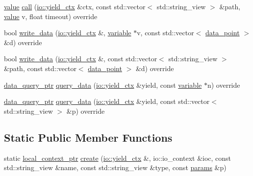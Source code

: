 \begin{DoxyCompactItemize}
\item 
\hyperlink{classtelegraph_1_1value}{value} \hyperlink{classtelegraph_1_1device_a581368ab8f35ef72db17d2e330ded068}{call} (\hyperlink{structboost_1_1asio_1_1yield__ctx}{io\+::yield\+\_\+ctx} \&ctx, const std\+::vector$<$ std\+::string\+\_\+view $>$ \&path, \hyperlink{classtelegraph_1_1value}{value} v, float timeout) override
\item 
bool \hyperlink{classtelegraph_1_1device_a60150e55bc6fb63d27252051caf462db}{write\+\_\+data} (\hyperlink{structboost_1_1asio_1_1yield__ctx}{io\+::yield\+\_\+ctx} \&, \hyperlink{classtelegraph_1_1variable}{variable} $\ast$v, const std\+::vector$<$ \hyperlink{classtelegraph_1_1data__point}{data\+\_\+point} $>$ \&d) override
\item 
bool \hyperlink{classtelegraph_1_1device_aaedca7b20bc36f8439d5afccbcaf1304}{write\+\_\+data} (\hyperlink{structboost_1_1asio_1_1yield__ctx}{io\+::yield\+\_\+ctx} \&, const std\+::vector$<$ std\+::string\+\_\+view $>$ \&path, const std\+::vector$<$ \hyperlink{classtelegraph_1_1data__point}{data\+\_\+point} $>$ \&d) override
\item 
\hyperlink{namespacetelegraph_a6ffe775ac48dca2a4013b53d692199c8}{data\+\_\+query\+\_\+ptr} \hyperlink{classtelegraph_1_1device_a4c46c7e98bf5a573a9966fd2cc199021}{query\+\_\+data} (\hyperlink{structboost_1_1asio_1_1yield__ctx}{io\+::yield\+\_\+ctx} \&yield, const \hyperlink{classtelegraph_1_1variable}{variable} $\ast$n) override
\item 
\hyperlink{namespacetelegraph_a6ffe775ac48dca2a4013b53d692199c8}{data\+\_\+query\+\_\+ptr} \hyperlink{classtelegraph_1_1device_a9a5ef799aadf591a355cc1e50442d762}{query\+\_\+data} (\hyperlink{structboost_1_1asio_1_1yield__ctx}{io\+::yield\+\_\+ctx} \&yield, const std\+::vector$<$ std\+::string\+\_\+view $>$ \&p) override
\end{DoxyCompactItemize}
\subsection*{Static Public Member Functions}
\begin{DoxyCompactItemize}
\item 
static \hyperlink{namespacetelegraph_ab59c7b38d99a98b4acc22433c920b1e6}{local\+\_\+context\+\_\+ptr} \hyperlink{classtelegraph_1_1device_a4bb333fc0232bdb69283e71f086028c4}{create} (\hyperlink{structboost_1_1asio_1_1yield__ctx}{io\+::yield\+\_\+ctx} \&, io\+::io\+\_\+context \&ioc, const std\+::string\+\_\+view \&name, const std\+::string\+\_\+view \&type, const \hyperlink{classtelegraph_1_1params}{params} \&p)
\end{DoxyCompactItemize}
